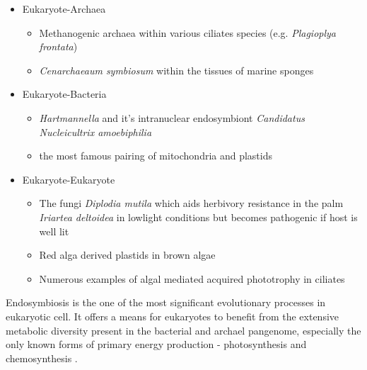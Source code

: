 \begin{itemize}
    \item Eukaryote-Archaea \citep{Moissl-Eichinger2011}
    \begin{itemize}
        \item Methanogenic archaea within various ciliates species (e.g. \textit{Plagioplya frontata}) \citep{Fenchel1992,Lange2005}
        \item \textit{Cenarchaeaum symbiosum} within the tissues of marine sponges \citep{Preston1996,Wrede2012}
    \end{itemize}
        \item Eukaryote-Bacteria 
    \begin{itemize}
         \item \textit{Hartmannella} and it's intranuclear endosymbiont \textit{Candidatus Nucleicultrix amoebiphilia} \citep{Schulz2014}
         \item the most famous pairing of mitochondria and plastids
    \end{itemize}
    \item Eukaryote-Eukaryote
    \begin{itemize}
        \item The fungi \textit{Diplodia mutila} which aids herbivory resistance in the palm \textit{Iriartea deltoidea} in lowlight
            conditions but becomes pathogenic if host is well lit \citep{Alvarez-Loayza2011}
        \item Red alga derived plastids in brown algae \citep{Dorrell2011}
        \item Numerous examples of algal mediated acquired phototrophy in ciliates \citep{Johnson2011}
    \end{itemize}
\end{itemize}

Endosymbiosis is the one of the most significant evolutionary processes in eukaryotic cell.
It offers a means for eukaryotes to benefit from the extensive metabolic diversity
present in the bacterial and archael pangenome, especially the only known forms of primary energy
production - photosynthesis and chemosynthesis \citep{Wernegreen2012}.

